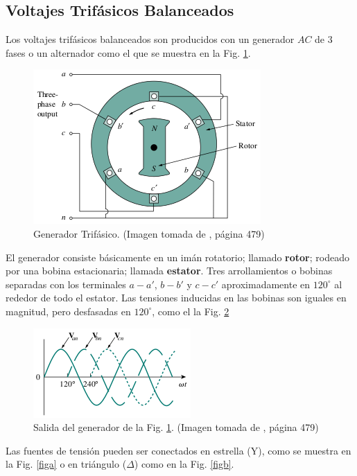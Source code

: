 \documentclass[twocolumn]{IEEEtran}
\begin{document}
\subsection{Voltajes Trifásicos Balanceados}
\noindent
Los voltajes trifásicos balanceados son producidos con un generador $AC$ de $3$ fases o un alternador como el que se muestra en la Fig. \ref{fig1}.
\begin{figure}[H]
	\centering
		\includegraphics[scale=0.75]{generator.png}
	\caption{Generador Trifásico. (Imagen tomada de \cite{sadiku}, página 479)}
	\label{fig1}
\end{figure}
\noindent
El generador consiste básicamente en un imán rotatorio; llamado \textbf{rotor}; rodeado por una bobina estacionaria; llamada \textbf{estator}. Tres arrollamientos o bobinas separadas con los terminales $a - a'$, $b - b'$ y $c - c'$ aproximadamente en $120^{\circ}$ al rededor de todo el estator. Las tensiones inducidas en las bobinas son iguales en magnitud, pero desfasadas en $120^{\circ}$, como el la Fig. \ref{fig2}
\begin{figure}[H]
	\centering
		\includegraphics[scale=0.9]{outgenerator.png}
	\caption{Salida del generador de la Fig. \ref{fig1}. (Imagen tomada de \cite{sadiku}, página 479)}
	\label{fig2}
\end{figure}
\noindent
Las fuentes de tensión pueden ser conectados en estrella (Y), como se muestra en la Fig. \ref{figa} o en triángulo ($\Delta$) como en la Fig. \ref{figb}.
\end{document}
